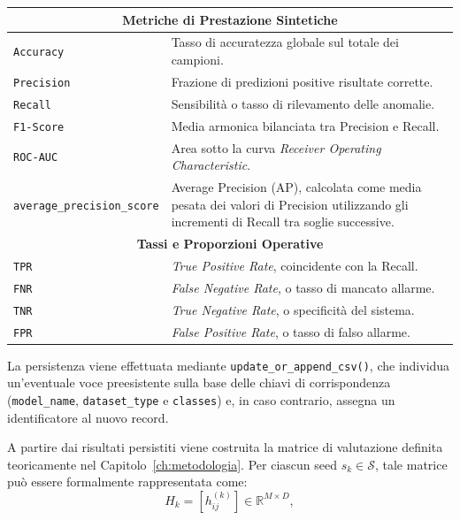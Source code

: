 \begin{table}[H]
\begin{tabularx}{\textwidth}{l >{\raggedright\arraybackslash}X}
        \hline
        \multicolumn{2}{c}{\textbf{Metriche di Prestazione Sintetiche}} \\
        \hline
        \texttt{Accuracy} & Tasso di accuratezza globale sul totale dei campioni. \\
        \texttt{Precision} & Frazione di predizioni positive risultate corrette. \\
        \texttt{Recall} & Sensibilità o tasso di rilevamento delle anomalie. \\
        \texttt{F1-Score} & Media armonica bilanciata tra Precision e Recall. \\
        \texttt{ROC-AUC} & Area sotto la curva \textit{Receiver Operating Characteristic}. \\
        \texttt{average\_precision\_score} & Average Precision (AP), calcolata come media pesata dei valori di Precision utilizzando gli incrementi di Recall tra soglie successive. \\
        \hline
        \multicolumn{2}{c}{\textbf{Tassi e Proporzioni Operative}} \\
        \hline
        \texttt{TPR} & \textit{True Positive Rate}, coincidente con la Recall. \\
        \texttt{FNR} & \textit{False Negative Rate}, o tasso di mancato allarme. \\
        \texttt{TNR} & \textit{True Negative Rate}, o specificità del sistema. \\
        \texttt{FPR} & \textit{False Positive Rate}, o tasso di falso allarme. \\
        \bottomrule
    \end{tabularx}
\end{table}

La persistenza viene effettuata mediante \texttt{update\_or\_append\_csv()}, che individua un'eventuale voce preesistente sulla base delle chiavi di corrispondenza (\texttt{model\_name}, \texttt{dataset\_type} e \texttt{classes}) e, in caso contrario, assegna un identificatore al nuovo record. 

A partire dai risultati persistiti viene costruita la matrice di valutazione definita teoricamente nel Capitolo~\ref{ch:metodologia}. 
Per ciascun seed $s_k \in \mathcal{S}$, tale matrice può essere formalmente rappresentata come:
\begin{equation}
H_k = \left[ h_{ij}^{(k)} \right] \in \mathbb{R}^{M \times D},
\label{eq:hk_implementation}
\end{equation}

